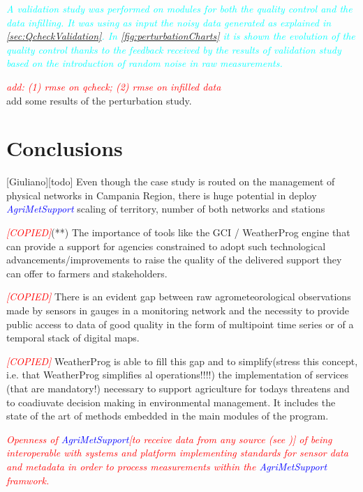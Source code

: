 \documentclass[authoryear,preprint,review,12pt]{elsarticle}
\newcommand{\note}[1]{\emph{\textcolor{red}{#1}}}
\newcommand{\update}[1]{\emph{\textcolor{blue}{#1}}}
\newcommand{\review}[1]{\emph{\textcolor{cyan}{#1}}}
\newcommand{\gci}{\update{AgriMetSupport}\xspace}
\begin{document}
\review{
A validation study was performed on modules for both the quality control and the data infilling.
It was using as input the noisy data generated as explained in \cref{sec:QcheckValidation}.
In \cref{fig:perturbationCharts} it is shown the evolution of the quality control thanks to the feedback received by the results of validation study based on the introduction of random noise in raw measurements.
}

\note{add: (1) rmse on qcheck; (2) rmse on infilled data}\\

add some results of the perturbation study.

\section{Conclusions}[Giuliano][todo]
Even though the case study is routed on the management of physical networks in Campania Region, there is huge potential in deploy \gci scaling of territory, number of both networks and stations

\note{[COPIED]}(**) The importance of tools like the GCI / WeatherProg engine that can provide a support for agencies constrained to adopt such technological advancements/improvements to raise the quality of the delivered support they can offer to farmers and stakeholders.

\note{[COPIED]} There is an evident gap between raw agrometeorological observations made by sensors in gauges in a monitoring network and the necessity to provide public access to data of good quality in the form of multipoint time series or of a temporal stack of digital maps.

\note{[COPIED]} WeatherProg is able to fill this gap and to simplify(stress this concept, i.e. that WeatherProg simplifies al operations!!!!) the implementation of services (that are mandatory!) necessary to support agriculture for todays threatens and to coadiuvate decision making in environmental management. It includes the state of the art of methods embedded in the main modules of the program.

\note{Openness of \gci [to receive data from any source (see \citep{SAWANT_2017})] of being interoperable with systems and platform implementing  standards for sensor data and metadata in order to process measurements within the \gci framwork.}
\end{document}
